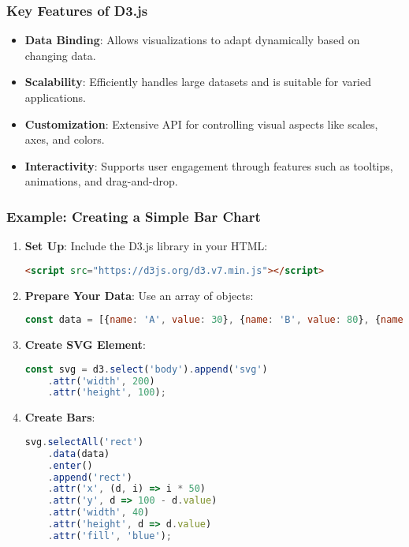 \documentclass{beamer}
\begin{document}
\begin{frame}
    \frametitle{Key Features of D3.js}
    \begin{itemize}
        \item \textbf{Data Binding}: Allows visualizations to adapt dynamically based on changing data.
        \item \textbf{Scalability}: Efficiently handles large datasets and is suitable for varied applications.
        \item \textbf{Customization}: Extensive API for controlling visual aspects like scales, axes, and colors.
        \item \textbf{Interactivity}: Supports user engagement through features such as tooltips, animations, and drag-and-drop.
    \end{itemize}
\end{frame}

\begin{frame}[fragile]
    \frametitle{Example: Creating a Simple Bar Chart}
    \begin{enumerate}
        \item \textbf{Set Up}: Include the D3.js library in your HTML:
        \begin{lstlisting}[language=html]
<script src="https://d3js.org/d3.v7.min.js"></script>
        \end{lstlisting}

        \item \textbf{Prepare Your Data}: Use an array of objects:
        \begin{lstlisting}[language=javascript]
const data = [{name: 'A', value: 30}, {name: 'B', value: 80}, {name: 'C', value: 45}];
        \end{lstlisting}

        \item \textbf{Create SVG Element}:
        \begin{lstlisting}[language=javascript]
const svg = d3.select('body').append('svg')
    .attr('width', 200)
    .attr('height', 100);
        \end{lstlisting}

        \item \textbf{Create Bars}:
        \begin{lstlisting}[language=javascript]
svg.selectAll('rect')
    .data(data)
    .enter()
    .append('rect')
    .attr('x', (d, i) => i * 50)
    .attr('y', d => 100 - d.value)
    .attr('width', 40)
    .attr('height', d => d.value)
    .attr('fill', 'blue');
        \end{lstlisting}
    \end{enumerate}
\end{frame}
\end{document}

